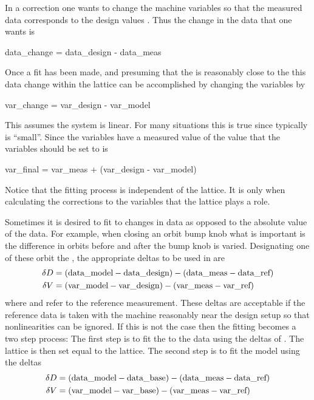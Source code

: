 In a correction one wants to change the machine variables so that the
measured data corresponds to the design values . Thus
the change in the data that one wants is
\begin{example}
  data_change = data_design - data_meas
\end{example}
Once a fit has been made, and presuming that the  is
reasonably close to the  this data change within the
 lattice can be accomplished by changing the variables by
\begin{example}
  var_change = var_design - var_model
\end{example}
This assumes the system is linear. For many situations this is true
since typically  is ``small''. Since the variables have
a measured value of  the value that the variables should
be set to is
\begin{example}
  var_final = var_meas + (var_design - var_model)
\end{example}
Notice that the fitting process is independent of the 
lattice. It is only when calculating the corrections to the
variables that the  lattice plays a role. 

Sometimes it is desired to fit to changes in data as opposed to the absolute value of the
data. For example, when closing an orbit bump knob what is important is the difference in
orbits before and after the bump knob is varied. Designating one of these orbit the
, the appropriate deltas to be used in  are
\begin{align}
  \delta D &= ({\mbox{data}}\_{\mbox{model}} - {\mbox{data}}\_{\mbox{design}}) - ({\mbox{data}}\_{\mbox{meas}} - {\mbox{data}}\_{\mbox{ref}}) \nonumber \\
  \delta V &= ({\mbox{var}}\_{\mbox{model}} - {\mbox{var}}\_{\mbox{design}})   - ({\mbox{var}}\_{\mbox{meas}} - {\mbox{var}}\_{\mbox{ref}})
  \label{dd2}
\end{align}
where  and  refer to the reference measurement.  These deltas
are acceptable if the reference data is taken with the machine reasonably near the
design setup so that nonlinearities can be ignored. If this is not the case then the
fitting becomes a two step process: The first step is to fit the  to the
 data using the deltas of . The  lattice is then set
equal to the  lattice. The second step is to fit the model using the deltas
\begin{align}
  \delta D &= ({\mbox{data}}\_{\mbox{model}} - {\mbox{data}}\_{\mbox{base}}) - ({\mbox{data}}\_{\mbox{meas}} - {\mbox{data}}\_{\mbox{ref}}) \nonumber \\
  \delta V &= ({\mbox{var}}\_{\mbox{model}} - {\mbox{var}}\_{\mbox{base}})   - ({\mbox{var}}\_{\mbox{meas}} - {\mbox{var}}\_{\mbox{ref}})
  \label{dd3}
\end{align}

